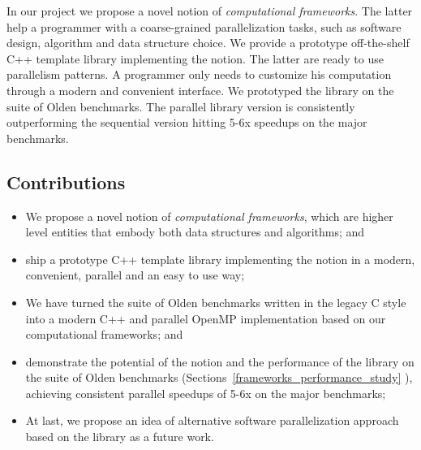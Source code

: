 \quad In our project we propose a novel notion of \textit{computational frameworks}. The latter help a programmer with a coarse-grained parallelization tasks, such as software design, algorithm and data structure choice. We provide a prototype off-the-shelf C++ template library implementing the notion. The latter are ready to use parallelism patterns. A programmer only needs to customize his computation through a modern and convenient interface. We prototyped the library on the suite of Olden benchmarks. The parallel library version is consistently outperforming the sequential version hitting 5-6x speedups on the major benchmarks.
\subsection{Contributions}
\begin{itemize}[style=unboxed,leftmargin=0cm]
\itemsep0em
\renewcommand\labelitemi{$\vartriangleright$}
\renewcommand\labelitemii{$\bullet$}
\item We propose a novel notion of \textit{computational frameworks}, which are higher level entities that embody both data structures and algorithms; and
\item ship a prototype C++ template library implementing the notion in a modern, convenient, parallel and an easy to use way;
\item We have turned the suite of Olden benchmarks written in the legacy C style into a modern C++ and parallel OpenMP implementation based on our computational frameworks; and
\item demonstrate the potential of the notion and the performance of the library on the suite of Olden benchmarks (Sections~\ref{frameworks_performance_study} ), achieving consistent parallel speedups of 5-6x on the major benchmarks;
\item At last, we propose an idea of alternative software parallelization approach based on the library as a future work.
\end{itemize}

%